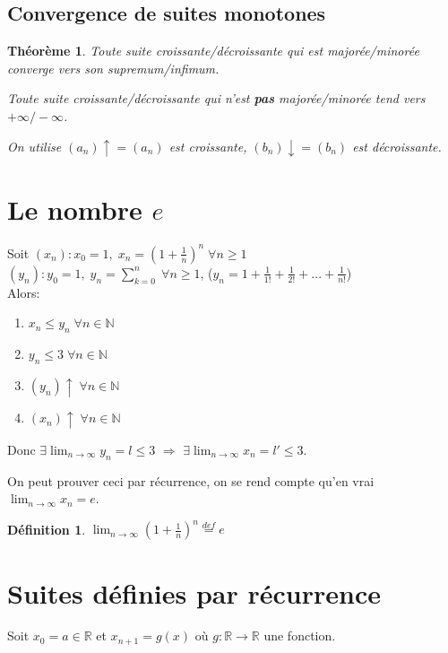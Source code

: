 \documentclass[10pt,a4paper]{book}
\newcommand{\R}{\mathbb{R}}
\newcommand{\N}{\mathbb{N}}
\newtheorem{theorem}{Théorème}[section]
\newtheorem{definition}{Définition}[section]
\begin{document}
\subsection{Convergence de suites monotones}

\begin{theorem}
Toute suite croissante/décroissante qui est majorée/minorée converge vers son supremum/infimum. \par
Toute suite croissante/décroissante qui n'est \textbf{pas} majorée/minorée tend vers $+\infty/-\infty$. \par 
On utilise $(a_n)\uparrow = (a_n)$ est croissante, $(b_n)\downarrow = (b_n)$ est décroissante.
\end{theorem}

\section{Le nombre \texorpdfstring{$e$}{e}}

Soit $(x_n): x_0=1,\; x_n = \left(1+\frac{1}{n}\right)^n \; \forall n \geq 1$ \\
$(y_n): y_0=1,\; y_n= \sum^n_{k=0} \; \forall n \geq 1$, ($y_n=1+\frac{1}{1!}+\frac{1}{2!}+...+\frac{1}{n!}$) \\
Alors:
\begin{enumerate}
\item $x_n \leq y_n \; \forall n\in \N$
\item $y_n \leq 3 \; \forall n\in \N$
\item $(y_n)\uparrow \; \forall n\in \N$
\item $(x_n)\uparrow \; \forall n\in \N$
\end{enumerate}	
Donc $\exists \lim_{n\rightarrow \infty}y_n = l \leq 3$ $\Rightarrow$ $\exists \lim_{n\rightarrow \infty}x_n = l' \leq 3$. \par
On peut prouver ceci par récurrence, on se rend compte qu'en vrai $\lim_{n\rightarrow \infty}x_n = e$.

\begin{definition}
$\lim_{n\rightarrow \infty}\left(1 + \frac{1}{n}\right)^n \overset{def}{=} e$
\end{definition}

\section{Suites définies par récurrence}

Soit $x_0=a\in \R$ et $x_{n+1} = g(x)$ où $g:\R \rightarrow \R$ une fonction.
\end{document}
